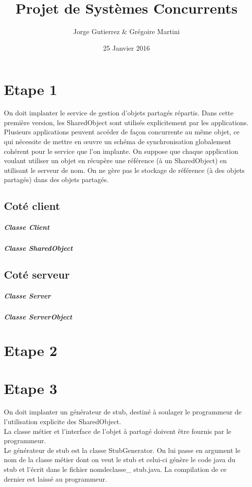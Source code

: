 \documentclass[a4paper,12pt]{article}
\title{Projet de Systèmes Concurrents}
\author{Jorge Gutierrez \& Grégoire Martini}
\date{25 Janvier 2016}
\begin{document}
\maketitle

\bigskip
\bigskip
\bigskip
\tableofcontents
\newpage


\section{Etape 1}

On doit implanter le service de gestion d'objets partagés répartis. Dans cette première version, les 
SharedObject sont utilisés explicitement par les applications. \\

Plusieurs applications peuvent accéder de façon concurrente au même objet, ce qui nécessite de mettre en 
œuvre un schéma de synchronisation globalement cohérent pour le service que l'on implante.
On suppose que chaque application voulant utiliser un objet en récupère une référence (à un SharedObject) en 
utilisant le serveur de nom. On ne gère pas le stockage de référence (à des objets partagés) dans des objets partagés.

\subsection{Coté client}
\subparagraph{Classe Client}
\subparagraph{Classe SharedObject}

\subsection{Coté serveur}
\subparagraph{Classe Server}
\subparagraph{Classe ServerObject}


\clearpage
\section{Etape 2}

\clearpage
\section{Etape 3}

On doit  implanter un générateur de stub, destiné à soulager le programmeur de l'utilisation explicite des SharedObject. \\

La classe métier et l'interface de l'objet à partagé doivent être fournis par le programmeur.\\
Le générateur de stub est la classe StubGenerator. On lui passe en argument le nom de la classe métier dont on veut le stub et celui-ci génère le code java du stub et l'écrit dans le fichier nomdeclasse\_ stub.java. La compilation de ce dernier est laissé au programmeur.\\
\end{document}
